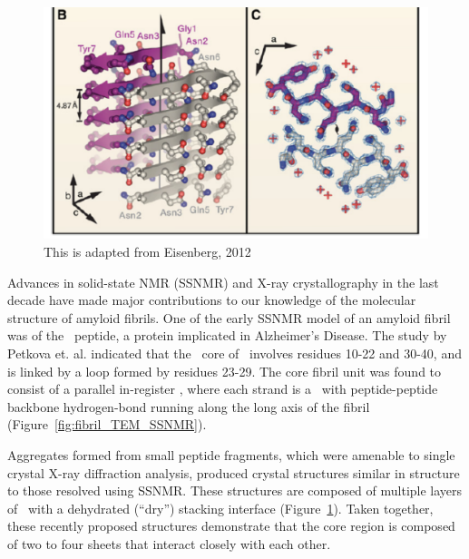 \begin{figure}
  \centering
  \includegraphics[width=6in]{figures/introduction/fibril_xray_model.pdf}
  \caption[Characteristic cross-$\beta$ spacings from X-ray fibre diffraction studies of amyloid fibrils]{This is adapted from Eisenberg, 2012}
  \label{fig:fibril_xray_model}
\end{figure}


Advances in solid-state NMR (SSNMR) and X-ray crystallography in the last decade have made major contributions to our knowledge of the molecular structure of amyloid fibrils. One of the early SSNMR model of an amyloid fibril was of the \ peptide, a protein implicated in Alzheimer's Disease. The study by Petkova et. al.\cite{Petkova:2006gx} indicated that the \bsheet\ core of \ involves residues 10-22 and 30-40, and is linked by a loop formed by residues 23-29. The core fibril unit was found to consist of a parallel in-register \bsheet, where each strand is a \bhairpin\ with peptide-peptide backbone hydrogen-bond running along the long axis of the fibril (Figure~\ref{fig:fibril_TEM_SSNMR}).

Aggregates formed from small peptide fragments, which were amenable to single crystal X-ray diffraction analysis, produced crystal structures similar in structure to those resolved using SSNMR. These structures are composed of multiple layers of \bsheet\ with a dehydrated (``dry'') stacking interface (Figure~\ref{fig:fibril_xray_model}). Taken together, these recently proposed structures demonstrate that the core region is composed of two to four sheets that interact closely with each other. %

